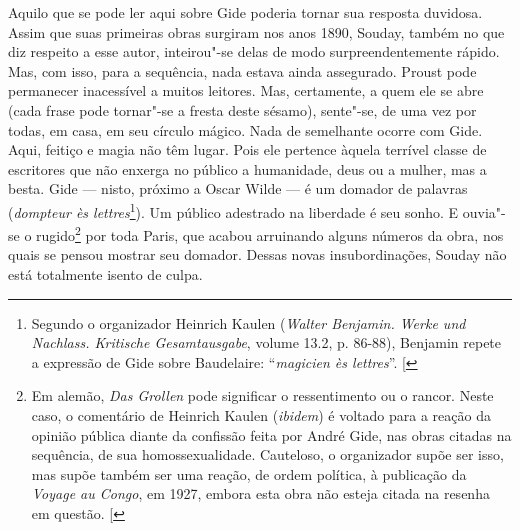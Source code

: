 Aquilo que se pode ler aqui sobre Gide poderia tornar sua resposta
duvidosa. Assim que suas primeiras obras surgiram nos anos 1890, Souday,
também no que diz respeito a esse autor, inteirou"-se delas de modo
surpreendentemente rápido. Mas, com isso, para a sequência, nada estava
ainda assegurado. Proust pode permanecer inacessível a muitos leitores.
Mas, certamente, a quem ele se abre (cada frase pode tornar"-se a fresta
deste sésamo), sente"-se, de uma vez por todas, em casa, em seu círculo
mágico. Nada de semelhante ocorre com Gide. Aqui, feitiço e magia não
têm lugar. Pois ele pertence àquela terrível classe de escritores que
não enxerga no público a humanidade, deus ou a mulher, mas a besta. Gide
--- nisto, próximo a Oscar Wilde --- é um domador de palavras
(\emph{dompteur ès lettres}\footnote{Segundo o organizador Heinrich
  Kaulen (\emph{Walter Benjamin. Werke und Nachlass. Kritische
  Gesamtausgabe}, volume 13.2, p. 86-88), Benjamin repete a expressão de
  Gide sobre Baudelaire: ``\emph{magicien ès lettres}''. {[}\versal{N. E.}{]}}).
Um público adestrado na liberdade é seu sonho. E ouvia"-se o
rugido\footnote{Em alemão, \emph{Das Grollen} pode significar o
  ressentimento ou o rancor. Neste caso, o comentário de Heinrich Kaulen
  (\emph{ibidem}) é voltado para a reação da opinião pública diante da
  confissão feita por André Gide, nas obras citadas na sequência, de sua
  homossexualidade. Cauteloso, o organizador supõe ser isso, mas supõe
  também ser uma reação, de ordem política, à publicação da \emph{Voyage
  au Congo}, em 1927, embora esta obra não esteja citada na resenha em
  questão. {[}\versal{N. E.}{]}} por toda Paris, que acabou arruinando alguns
números da obra, nos quais se pensou mostrar seu domador. Dessas novas
insubordinações, Souday não está totalmente isento de culpa.

